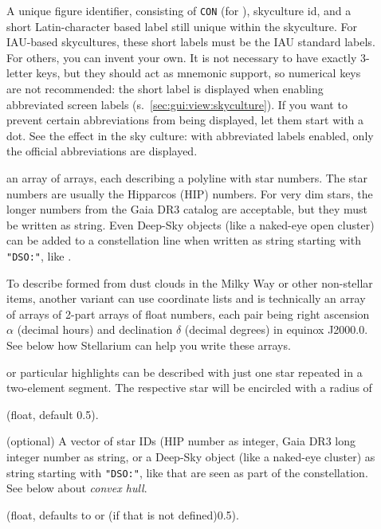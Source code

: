 \begin{description}
\item[] A unique figure identifier, consisting of \texttt{CON} (for ), skyculture id, 
                 and a short Latin-character based label still unique within the skyculture.
                 For IAU-based skycultures, these short labels must be the IAU standard labels. For others, you can invent your own. It is not necessary to have exactly
                 3-letter keys, but they should act as mnemonic support, so numerical keys are not recommended:  
                 the short label is displayed when enabling abbreviated screen labels (s.~\ref{sec:gui:view:skyculture}). If you want to prevent
                 certain abbreviations from being displayed, let them start with a dot. See the effect in the  sky culture: with abbreviated labels enabled,
                 only the official abbreviations are displayed.

\item[] an array of arrays, each describing a polyline with star numbers. The star numbers are usually the Hipparcos (HIP) numbers. 
                    For very dim stars, the longer numbers from the Gaia DR3 catalog are acceptable, but they must be written as string.
		    Even Deep-Sky objects (like a naked-eye open cluster) can be added to a constellation line when written as 
		    string starting with \texttt{"DSO:"}, like .

                    To describe  formed from dust clouds in the Milky Way or other non-stellar items, 
                    another variant can use coordinate lists and is technically an array of arrays of 2-part arrays of float numbers, 
                    each pair being right ascension $\alpha$ (decimal hours) and declination $\delta$ (decimal degrees) in equinox J2000.0. 
                    See below how Stellarium can help you write these arrays.

                      or particular highlights can be described with just one star repeated in a two-element segment.
                    The respective star will be encircled with a radius of 
\item[] (float, default 0.5).
\item[] (optional) A vector of star IDs (HIP number as integer, Gaia DR3 long integer number as string, 
                              or a Deep-Sky object (like a naked-eye cluster) as string starting with \texttt{"DSO:"}, like  that are seen as part of the constellation.
			      See below about \emph{convex hull}.
\item[] (float, defaults to  or (if that is not defined)0.5).


\end{description}
